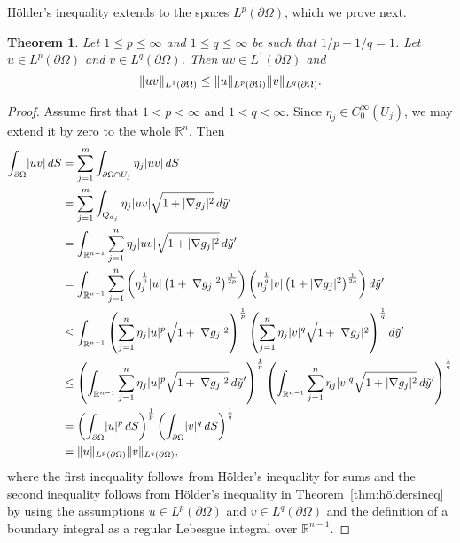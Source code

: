 \documentclass[english, 12pt, a4paper, sci, utf8, a-2b, online]{aaltothesis}
\theoremstyle{definition}
\theoremstyle{plain}
\newtheorem{theorem}{Theorem}[section]
\DeclarePairedDelimiter\abs{\lvert}{\rvert}
\DeclarePairedDelimiter\norm{\lVert}{\rVert}
\newcommand*\diff{\mathop{}\!d}
\numberwithin{equation}{section}
\begin{document}
Hölder's inequality extends to the spaces $L^p(\partial \Omega)$,
which we prove next.
\begin{theorem}
    \label{thm:boundaryhöldersineq}
    Let $1 \leq p \leq \infty$ and $1 \leq q \leq \infty$ be
    such that $1/p + 1/q = 1$.
    Let $u \in L^p(\partial \Omega)$ and $v \in L^q(\partial \Omega)$.
    Then $uv \in L^1(\partial \Omega)$ and
    \begin{equation*}
        \norm{uv}_{L^1(\partial \Omega)} \leq \norm{u}_{L^p(\partial \Omega)}
            \norm{v}_{L^q(\partial \Omega)}.
    \end{equation*}
\end{theorem}
\begin{proof}
    Assume first that $1 < p < \infty$ and $1 < q < \infty$.
    Since $\eta_j \in C_0^{\infty}(U_j)$, we may extend it by zero to the whole
    $\mathbb{R}^n$. Then 
    \begin{align*}
        \int_{\partial \Omega} \abs{uv} \diff S
        &= \sum_{j=1}^{m} \int_{\partial \Omega \cap U_j} \eta_j \abs{uv} \diff S \\
        &= \sum_{j=1}^{m} \int_{Q_{d_j}} \eta_j \abs{uv}
            \sqrt{1 + \abs{\nabla g_j}^2} \diff \tilde{y}' \\
        &= \int_{\mathbb{R}^{n-1}} \sum_{j=1}^{n} \eta_j \abs{uv}
            \sqrt{1 + \abs{\nabla g_j}^2} \diff \tilde{y}' \\
        &= \int_{\mathbb{R}^{n-1}} \sum_{j=1}^{n}
            \left( \eta_j^{\frac{1}{p}} \abs{u}
                \left( 1 + \abs{\nabla g_j}^2 \right)^{\frac{1}{2p}} \right)
            \left( \eta_j^{\frac{1}{q}} \abs{v}
                \left( 1 + \abs{\nabla g_j}^2 \right)^{\frac{1}{2q}} \right)
            \diff \tilde{y}' \\
        &\leq \int_{\mathbb{R}^{n-1}}
            \left( \sum_{j=1}^{n} \eta_j \abs{u}^p \sqrt{1 + \abs{\nabla g_j}^2} 
                \right)^{\frac{1}{p}}
            \left( \sum_{j=1}^{n} \eta_j \abs{v}^q \sqrt{1 + \abs{\nabla g_j}^2}
                \right)^{\frac{1}{q}}
            \diff \tilde{y}' \\
        &\leq \left( \int_{\mathbb{R}^{n-1}} \sum_{j=1}^{n} \eta_j \abs{u}^p
                \sqrt{1 + \abs{\nabla g_j}^2}
                    \diff \tilde{y}' \right)^{\frac{1}{p}}
            \left( \int_{\mathbb{R}^{n-1}} \sum_{j=1}^{n} \eta_j \abs{v}^q
                \sqrt{1 + \abs{\nabla g_j}^2}
                    \diff \tilde{y}' \right)^{\frac{1}{q}} \\
        &= \left( \int_{\partial \Omega} \abs{u}^p \diff S
                \right)^{\frac{1}{p}}
           \left( \int_{\partial \Omega} \abs{v}^q \diff S
                \right)^{\frac{1}{q}} \\
        &= \norm{u}_{L^p(\partial \Omega)} \norm{v}_{L^q(\partial \Omega)},
    \end{align*}
    where the first inequality follows from Hölder's inequality for sums
    and the second inequality follows from Hölder's inequality
    in Theorem~\ref{thm:höldersineq} by using the assumptions
    $u \in L^p(\partial \Omega)$ and $v \in L^q(\partial \Omega)$
    and the definition of a boundary integral as a regular Lebesgue integral
    over $\mathbb{R}^{n-1}$.


\end{proof}
\end{document}
